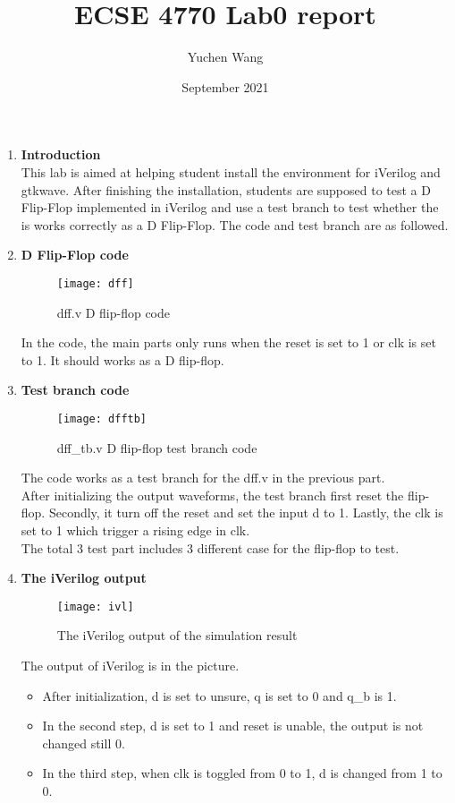 \documentclass[12pt,titlepage]{article}
\title{ECSE 4770 Lab0 report}
\author{Yuchen Wang}
\date{September 2021}
\begin{document}
\maketitle


\begin{enumerate}[noitemsep]
\item \textbf{Introduction}\\
This lab is aimed at helping student install the environment for iVerilog and gtkwave. After finishing the installation, students are supposed to test a D Flip-Flop implemented in iVerilog and use a test branch to test whether the is works correctly as a D Flip-Flop. The code and test branch are as followed.\\


\item \textbf{D Flip-Flop code}
\begin{figure}[H]
	\centering
	\texttt{[image: dff]}
	\caption{dff.v D flip-flop code}
  \end{figure}
  In the code, the main parts only runs when the reset is set to 1 or clk is set to 1. It should works as a D flip-flop.
  \clearpage


\item \textbf{Test branch code}
\begin{figure}[H]
	\centering
	\texttt{[image: dfftb]}
	\caption{dff\_tb.v D flip-flop test branch code}
  \end{figure}
  The code works as a test branch for the dff.v in the previous part.\\
  After initializing the output waveforms, the test branch first reset the flip-flop. Secondly, it turn off the reset and set the input d to 1. Lastly, the clk is set to 1 which trigger a rising edge in clk.\\
  The total 3 test part includes 3 different case for the flip-flop to test.
  \clearpage

\item \textbf{The iVerilog output}
    \begin{figure}[H]
	   \centering
	   \texttt{[image: ivl]}
	   \caption{The iVerilog output of the simulation result}
    \end{figure}
    The output of iVerilog is in the picture.
    \begin{itemize}
      \item After initialization, d is set to unsure, q is set to 0 and q\_b is 1.
      \item In the second step, d is set to 1 and reset is unable, the output is not changed still 0.
      \item In the third step, when clk is toggled from 0 to 1, d is changed from 1 to 0.


\end{itemize}
\end{enumerate}
\end{document}
